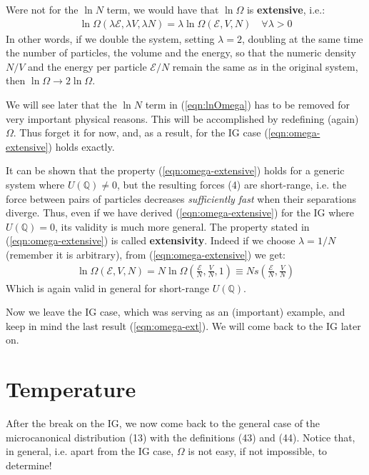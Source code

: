 \documentclass[../template.tex]{subfiles}
\begin{document}
Were not for the $\ln N$ term, we would have that $\ln \Omega$ is \textbf{extensive}, i.e.:
\begin{align}\label{eqn:omega-extensive}
    \ln \Omega(\lambda \mathcal{E}, \lambda V, \lambda N) = \lambda \ln \Omega(\mathcal{E}, V, N) \quad \forall \lambda > 0
\end{align} 
In other words, if we double the system, setting $\lambda=2$, doubling at the same time the number of particles, the volume and the energy, so that the numeric density $N/V$ and the energy per particle $\mathcal{E}/N$ remain the same as in the original system, then $\ln \Omega \to 2 \ln \Omega$.

\medskip

We will see later that the $\ln N$ term in (\ref{eqn:lnOmega}) has to be removed for very important physical reasons. This will be accomplished by redefining (again) $\Omega$. Thus forget it for now, and, as a result, for the IG case (\ref{eqn:omega-extensive}) holds exactly.
\medskip

It can be shown that the property (\ref{eqn:omega-extensive}) holds for a generic system where $U(\mathbb{Q}) \neq 0$, but the resulting forces (4) are short-range, i.e. the force between pairs of particles decreases \textit{sufficiently fast} when their separations diverge. Thus, even if we have derived (\ref{eqn:omega-extensive}) for the IG where $U(\mathbb{Q}) = 0$, its validity is much more general. The property stated in (\ref{eqn:omega-extensive}) is called \textbf{extensivity}. Indeed if we choose $\lambda = 1/N$ (remember it is arbitrary), from (\ref{eqn:omega-extensive})  we get:
\begin{align}\label{eqn:omega-ext}
    \ln \Omega(\mathcal{E}, V, N) = N \ln \Omega\left(\frac{\mathcal{E}}{N}, \frac{V}{N}, 1  \right) \equiv N s\left(\frac{\mathcal{E}}{N}, \frac{V}{N}  \right)
\end{align}
Which is again valid in general for short-range $U(\mathbb{Q})$.

\medskip

Now we leave the IG case, which was serving as an (important) example, and keep in mind the last result (\ref{eqn:omega-ext}). We will come back to the IG later on.

\section{Temperature}
After the break on the IG, we now come back to the general case of the microcanonical distribution (13) with the definitions (43) and (44). Notice that, in general, i.e. apart from the IG case, $\Omega$ is not easy, if not impossible, to determine!
\end{document}

